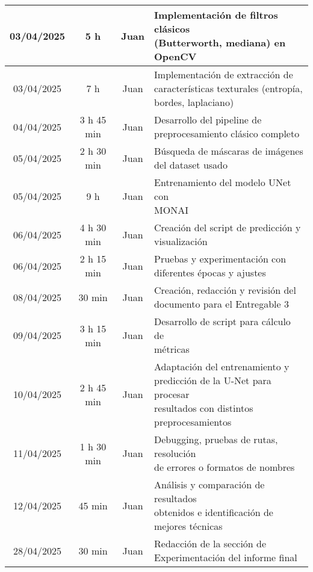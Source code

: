 \documentclass[12pt]{article}
\begin{document}
\begin{longtable}{|c|c|c|p{7.5cm}|}
\hline
03/04/2025 & 5 h & Juan & \makecell{Implementación de filtros clásicos \\ (Butterworth, mediana) en OpenCV} \\
\hline
03/04/2025 & 7 h & Juan & \makecell{Implementación de extracción de \\características texturales (entropía, \\bordes, laplaciano)} \\
\hline
04/04/2025 & 3 h 45 min & Juan & \makecell{Desarrollo del pipeline de \\ preprocesamiento clásico completo} \\
\hline
05/04/2025 & 2 h 30 min & Juan & \makecell{Búsqueda de máscaras de imágenes \\ del dataset usado} \\
\hline
05/04/2025 & 9 h & Juan & \makecell{Entrenamiento del modelo UNet con \\MONAI} \\
\hline
06/04/2025 & 4 h 30 min & Juan & \makecell{Creación del script de predicción y\\ visualización} \\
\hline
06/04/2025 & 2 h 15 min & Juan & \makecell{Pruebas y experimentación con \\ diferentes épocas y ajustes} \\
\hline
08/04/2025 & 30 min & Juan & \makecell{Creación, redacción y revisión del \\ documento para el Entregable 3} \\
\hline
09/04/2025 & 3 h 15 min & Juan & \makecell{Desarrollo de script para cálculo de \\métricas} \\
\hline
10/04/2025 & 2 h 45 min & Juan & \makecell{Adaptación del entrenamiento y \\ predicción de la U-Net para procesar \\ resultados con distintos preprocesamientos} \\
\hline
11/04/2025 & 1 h 30 min & Juan & \makecell{Debugging, pruebas de rutas, resolución \\ de errores o formatos de nombres} \\
\hline
12/04/2025 & 45 min & Juan & \makecell{Análisis y comparación de resultados \\ obtenidos e identificación de \\mejores técnicas} \\
\hline
28/04/2025 & 30 min & Juan & \makecell{Redacción de la sección de \\ Experimentación del informe final} \\

\end{longtable}
\end{document}
